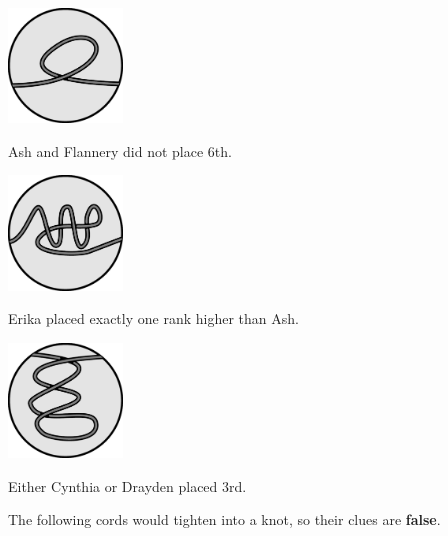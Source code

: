 \begin{multicols}{3}\footnotesize
  \begin{center}
    \includegraphics[width=1.2in]{assets/unknot1.pdf}

    Ash and Flannery did not place 6th.


    \includegraphics[width=1.2in]{assets/unknot2.pdf}

    Erika placed exactly one rank higher than Ash.


    \includegraphics[width=1.2in]{assets/unknot3.pdf}

    Either Cynthia or Drayden placed 3rd.
  \end{center}
\end{multicols}

The following cords would tighten into a knot, so their clues are
\textbf{false}.


